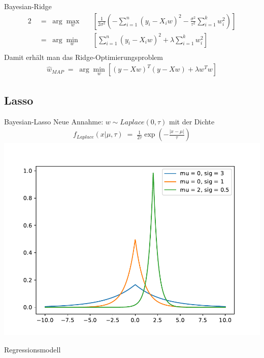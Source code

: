\documentclass{beamer}
\begin{document}
{\begin{frame}{Bayesian-Ridge}
	\begin{alignat}{2}
		&\;=\;\arg\underset{w}{\max} && \left[\frac{1}{2\sigma^2}\left(-\sum_{i=1}^{n}\left(y_i-X_iw\right)^2-\frac{\sigma^2}{\tau^2}\sum_{i=1}^{k}w_i^2\right)\right]\\
		&\;=\;\arg\underset{w}{\min} && \left[\sum_{i=1}^{n}\left(y_i-X_iw\right)^2+\lambda\sum_{i=1}^{k}w_i^2\right] \\
	\end{alignat}
	Damit erhält man das Ridge-Optimierungsproblem
	\begin{align}
		\hat{w}_{MAP}\;=\;\arg\underset{w}{\min}\left[\left(y-Xw\right)^T\left(y-Xw\right)+\lambda w^Tw\right]
	\end{align}
\end{frame}

\subsection{Lasso}

\begin{frame}{Bayesian-Lasso}
	Neue Annahme: $w\sim Laplace(0, \tau)$ mit der Dichte
	\begin{align}
		f_{Laplace}(x|\mu,\tau)\;=\;\frac{1}{2\tau}\exp\left(-\frac{\left|x-\mu\right|}{\tau}\right)
	\end{align}
	\centering\includegraphics[scale=0.4]{laplacedens.pdf}
\end{frame}

\begin{frame}{Regressionsmodell}
	\centering
\end{frame}}
\end{document}
